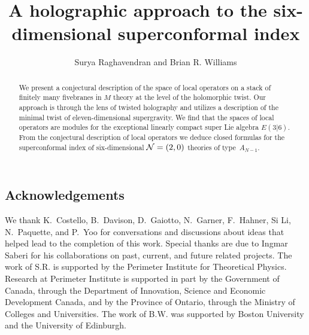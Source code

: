 \documentclass[11pt]{amsart}
\begin{document}
                                     
                                      
\title{A holographic approach to the six-dimensional superconformal index}
\author{Surya Raghavendran and Brian R. Williams}
\maketitle

\begin{abstract}
We present a conjectural description of the space of local operators on a stack of finitely many fivebranes in $M$ theory at the level of the holomorphic twist.
Our approach is through the lens of twisted holography and utilizes a description of the minimal twist of eleven-dimensional supergravity. 
We find that the spaces of local operators are modules for the exceptional linearly compact super Lie algebra $E(3|6)$.
From the conjectural description of local operators we deduce closed formulas for the superconformal index of six-dimensional $\mathcal N=(2,0)$ theories of type~$A_{N-1}$.
\end{abstract}

\setcounter{tocdepth}{1}
\tableofcontents



\subsection*{Acknowledgements}
We thank K.~Costello, B.~Davison, D.~Gaiotto, N.~Garner, F.~Hahner, Si Li, N.~Paquette, and P.~Yoo for conversations and discussions about ideas that helped lead to the completion of this work. 
Special thanks are due to Ingmar Saberi for his collaborations on past, current, and future related projects.
The work of S.R. is supported by the Perimeter Institute for Theoretical Physics. Research at Perimeter Institute is supported in part by the Government of Canada, through the Department of Innovation, Science and Economic Development Canada, and by the Province of Ontario, through the Ministry of Colleges and Universities.
The work of B.W. was supported by Boston University and the University of Edinburgh. 








 




\printbibliography
\end{document}
